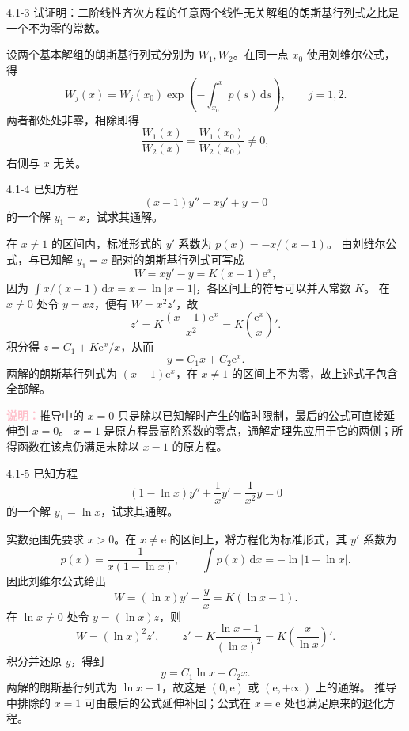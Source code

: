\documentclass[UTF8,a4paper,11pt]{ctexart}
\newcommand{\dd}{\,\mathrm d}
\newcommand{\e}{\mathrm e}
\newcommand{\note}[1]{\par\smallskip\noindent\textcolor{pink}{\bfseries 说明：}#1\par\smallskip}
\begin{document}
\begin{problem}{4.1-3}
试证明：二阶线性齐次方程的任意两个线性无关解组的朗斯基行列式之比是一个不为零的常数。
\end{problem}

\begin{solution}
设两个基本解组的朗斯基行列式分别为 $W_1,W_2$。在同一点 $x_0$ 使用刘维尔公式，得
\[
W_j(x)=W_j(x_0)\exp\left(-\int_{x_0}^xp(s)\dd s\right),\qquad j=1,2.
\]
两者都处处非零，相除即得
\[
\boxed{\frac{W_1(x)}{W_2(x)}=\frac{W_1(x_0)}{W_2(x_0)}\ne0,}
\]
右侧与 $x$ 无关。
\end{solution}

\begin{problem}{4.1-4}
已知方程
  \[
    (x-1)y''-xy'+y=0
  \]
  的一个解 $y_1=x$，试求其通解。
\end{problem}

\begin{solution}
在 $x\ne1$ 的区间内，标准形式的 $y'$ 系数为 $p(x)=-x/(x-1)$。
由刘维尔公式，与已知解 $y_1=x$ 配对的朗斯基行列式可写成
\[
W=xy'-y=K(x-1)\e^x,
\]
因为 $\int x/(x-1)\dd x=x+\ln|x-1|$，各区间上的符号可以并入常数 $K$。
在 $x\ne0$ 处令 $y=xz$，便有 $W=x^2z'$，故
\[
z'=K\frac{(x-1)\e^x}{x^2}
=K\left(\frac{\e^x}{x}\right)'.
\]
积分得 $z=C_1+K\e^x/x$，从而
\[
\boxed{y=C_1x+C_2\e^x.}
\]
两解的朗斯基行列式为 $(x-1)\e^x$，在 $x\ne1$ 的区间上不为零，故上述式子包含全部解。
\note{推导中的 $x=0$ 只是除以已知解时产生的临时限制，最后的公式可直接延伸到 $x=0$。
$x=1$ 是原方程最高阶系数的零点，通解定理先应用于它的两侧；所得函数在该点仍满足未除以 $x-1$ 的原方程。}
\end{solution}

\begin{problem}{4.1-5}
已知方程
  \[
    (1-\ln x)y''+\frac{1}{x}y'-\frac{1}{x^2}y=0
  \]
  的一个解 $y_1=\ln x$，试求其通解。
\end{problem}

\begin{solution}
实数范围先要求 $x>0$。在 $x\ne\e$ 的区间上，将方程化为标准形式，其 $y'$ 系数为
\[
p(x)=\frac{1}{x(1-\ln x)},\qquad
\int p(x)\dd x=-\ln|1-\ln x|.
\]
因此刘维尔公式给出
\[
W=(\ln x)y'-\frac{y}{x}=K(\ln x-1).
\]
在 $\ln x\ne0$ 处令 $y=(\ln x)z$，则
\[
W=(\ln x)^2z',\qquad
z'=K\frac{\ln x-1}{(\ln x)^2}
=K\left(\frac{x}{\ln x}\right)'.
\]
积分并还原 $y$，得到
\[
\boxed{y=C_1\ln x+C_2x.}
\]
两解的朗斯基行列式为 $\ln x-1$，故这是 $(0,\e)$ 或 $(\e,+\infty)$ 上的通解。
推导中排除的 $x=1$ 可由最后的公式延伸补回；公式在 $x=\e$ 处也满足原来的退化方程。
\end{solution}
\end{document}
